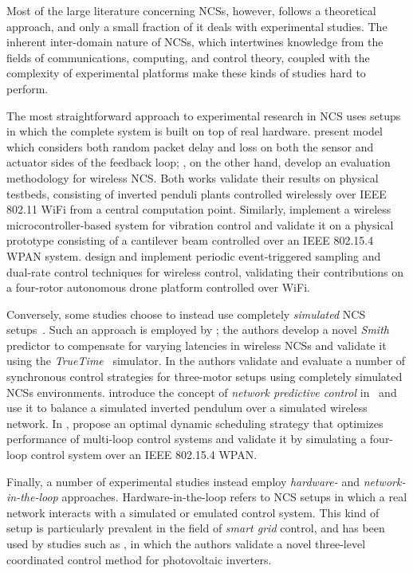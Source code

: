 Most of the large literature concerning \acp{NCS}, however, follows a theoretical approach, and only a small fraction of it deals with experimental studies.
The inherent inter-domain nature of \acp{NCS}, which intertwines knowledge from the fields of communications, computing, and control theory, coupled with the complexity of experimental platforms make these kinds of studies hard to perform.

The most straightforward approach to experimental research in \ac{NCS} uses setups in which the complete system is built on top of real hardware.
\textcite{Drew2005NCSWLAN} present  model which considers both random packet delay and loss on both the sensor and actuator sides of the feedback loop; \textcite{Baumann2018LowPower}, on the other hand, develop an evaluation methodology for wireless \ac{NCS}.
Both works validate their results on physical testbeds, consisting of inverted penduli plants controlled wirelessly over IEEE 802.11 WiFi from a central computation point.
Similarly, \textcite{Li2014Wireless} implement a wireless microcontroller-based system for vibration control and validate it on a physical prototype consisting of a cantilever beam controlled over an IEEE 802.15.4 \ac{WPAN} system.
\textcite{Cuenca2019UAV} design and implement periodic event-triggered sampling and dual-rate control techniques for wireless control, validating their contributions on a four-rotor autonomous drone platform controlled over WiFi.

Conversely, some studies choose to instead use completely \emph{simulated} \ac{NCS} setups~\cite{Andersson2005Simulation,Eyisi2012NCSWT}.
Such an approach is employed by \textcite{Du2009Smith}; the authors develop a novel \emph{Smith} predictor to compensate for varying latencies in wireless \acp{NCS} and validate it using the \emph{TrueTime}~\cite{Henriksson2002TrueTime} simulator.
In \textcite{Chen2015synccontrol} the authors validate and evaluate a number of synchronous control strategies for three-motor setups using completely simulated \acp{NCS} environments.
\citeauthor{Wu2012NPC} introduce the concept of \emph{network predictive control} in\ \cite{Wu2012NPC} and use it to balance a simulated inverted pendulum over a simulated wireless network.
In \cite{Ma2019DynamicSched}, \citeauthor{Ma2019DynamicSched} propose an optimal dynamic scheduling strategy that optimizes performance of multi-loop control systems and validate it by simulating a four-loop control system over an IEEE 802.15.4 \ac{WPAN}.


Finally, a number of experimental studies instead employ \emph{hardware-} and \emph{network-in-the-loop} approaches.
Hardware-in-the-loop refers to \ac{NCS} setups in which a real network interacts with a simulated or emulated control system.
This kind of setup is particularly prevalent in the field of \emph{smart grid} control, and has been used by studies such as \textcite{Wang2020VoltageControl}, in which the authors validate a novel three-level coordinated control method for photovoltaic inverters.

